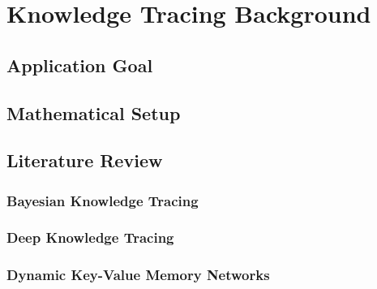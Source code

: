 \section{Knowledge Tracing Background}

\subsection{Application Goal}

\subsection{Mathematical Setup}

\subsection{Literature Review}

\subsubsection{Bayesian Knowledge Tracing}

\subsubsection{Deep Knowledge Tracing}

\subsubsection{Dynamic Key-Value Memory Networks}
